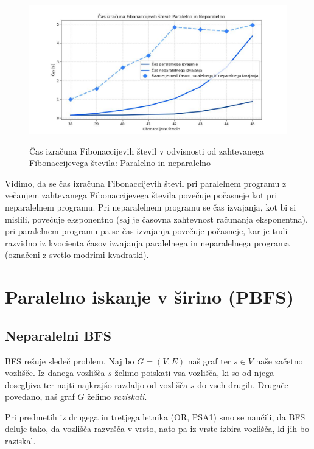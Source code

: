 \documentclass[mat1, tisk]{fmfdelo}
\begin{document}
\begin{figure}[h!]
  \centering
  \caption{Čas izračuna Fibonaccijevih števil v odvisnosti od zahtevanega Fibonaccijevega števila: Paralelno in neparalelno}
  \includegraphics[width=15cm]{slike/fib_par_v_odvisnosti_od_n.jpg}
  \label{fig:fib_par_v_odvisnosti_od_n}
\end{figure}

Vidimo, da se čas izračuna Fibonaccijevih števil pri paralelnem programu z večanjem zahtevanega Fibonaccijevega števila povečuje 
počasneje kot pri neparalelnem programu. Pri neparalelnem programu se čas izvajanja, kot bi si mislili, povečuje eksponentno 
(saj je časovna zahtevnost računanja eksponentna), pri paralelnem programu pa se čas izvajanja povečuje počasneje, kar je tudi 
razvidno iz kvocienta časov izvajanja paralelnega in neparalelnega programa (označeni z svetlo modrimi kvadratki).

\section{Paralelno iskanje v širino (PBFS)}

\subsection{Neparalelni BFS}

BFS rešuje sledeč problem. Naj bo $G=(V,E)$ naš graf ter $s \in V$ naše začetno vozlišče. 
Iz danega vozlišča $s$ želimo poiskati vsa vozlišča, ki so od njega dosegljiva 
ter najti najkrajšo razdaljo od vozlišča $s$ do vseh drugih.
Drugače povedano, naš graf $G$ želimo \textit{raziskati}.

Pri predmetih iz drugega in tretjega letnika (OR, PSA1) smo se naučili, da BFS deluje tako, da
vozlišča razvršča v vrsto, nato pa iz vrste izbira vozlišča, ki jih bo raziskal.
\end{document}
